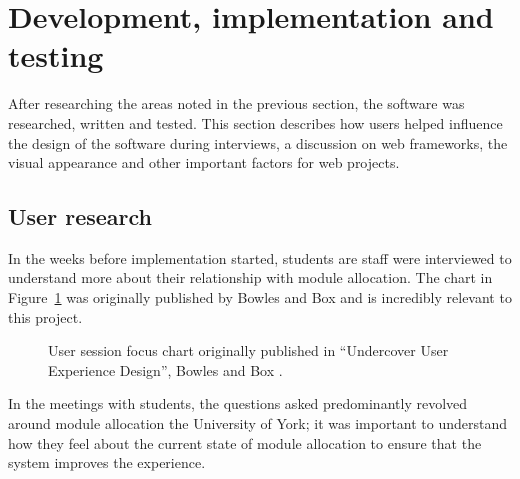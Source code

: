 \documentclass[]{scrartcl}
\begin{document}
\section{Development, implementation and testing}


After researching the areas noted in the previous section, the software was
researched, written and tested. This section describes how users helped
influence the design of the software during interviews, a discussion on web
frameworks, the visual appearance and other important factors for web
projects.

\subsection{User research}

In the weeks before implementation started, students are staff were
interviewed to understand more about their relationship with module
allocation. The chart in Figure~\ref{bowles_dualpurpose_chart} was originally
published by Bowles and Box and is incredibly relevant to this project.

\begin{figure}
  \begin{center}
  \end{center}
  \caption{User session focus chart originally published in
    ``Undercover User Experience Design'', Bowles and Box \cite{bowles2011undercover}.}
  \label{bowles_dualpurpose_chart}
\end{figure}

In the meetings with students, the questions asked predominantly revolved
around module allocation the University of York; it was important to
understand how they feel about the current state of module allocation to
ensure that the system improves the experience.
\end{document}
